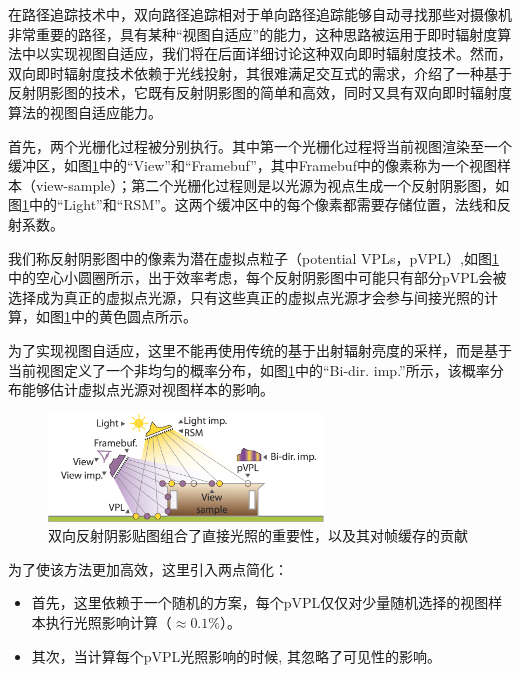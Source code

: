 在路径追踪技术中，双向路径追踪相对于单向路径追踪能够自动寻找那些对摄像机非常重要的路径，具有某种“视图自适应”的能力，这种思路被运用于即时辐射度算法中以实现视图自适应，我们将在后面详细讨论这种双向即时辐射度技术\cite{a:BidirectionalInstantRadiosity}。然而，双向即时辐射度技术依赖于光线投射，其很难满足交互式的需求，\cite{a:MakingImperfectShadowMapsViewAdaptive}介绍了一种基于反射阴影图的技术，它既有反射阴影图的简单和高效，同时又具有双向即时辐射度算法的视图自适应能力。

首先，两个光栅化过程被分别执行。其中第一个光栅化过程将当前视图渲染至一个缓冲区，如图\ref{f:ir-adaptive-rsm}中的“View”和“Framebuf”，其中Framebuf中的像素称为一个视图样本（view-sample）；第二个光栅化过程则是以光源为视点生成一个反射阴影图，如图\ref{f:ir-adaptive-rsm}中的“Light”和“RSM”。这两个缓冲区中的每个像素都需要存储位置，法线和反射系数。

我们称反射阴影图中的像素为潜在虚拟点粒子（potential VPLs，pVPL）,如图\ref{f:ir-adaptive-rsm}中的空心小圆圈所示，出于效率考虑，每个反射阴影图中可能只有部分pVPL会被选择成为真正的虚拟点光源，只有这些真正的虚拟点光源才会参与间接光照的计算，如图\ref{f:ir-adaptive-rsm}中的黄色圆点所示。 

为了实现视图自适应，这里不能再使用传统的基于出射辐射亮度的采样，而是基于当前视图定义了一个非均匀的概率分布，如图\ref{f:ir-adaptive-rsm}中的“Bi-dir. imp.”所示，该概率分布能够估计虚拟点光源对视图样本的影响。

\begin{figure}
	\sidecaption
	\includegraphics[width=0.65\textwidth]{figures/ir/ir-5-1}
	\caption{双向反射阴影贴图组合了直接光照的重要性，以及其对帧缓存的贡献}
	\label{f:ir-adaptive-rsm}
\end{figure}

为了使该方法更加高效，这里引入两点简化：

\begin{itemize}
	\item 首先，这里依赖于一个随机的方案，每个pVPL仅仅对少量随机选择的视图样本执行光照影响计算（$\approx 0.1\%$）。
	\item 其次，当计算每个pVPL光照影响的时候, 其忽略了可见性的影响。
\end{itemize}

